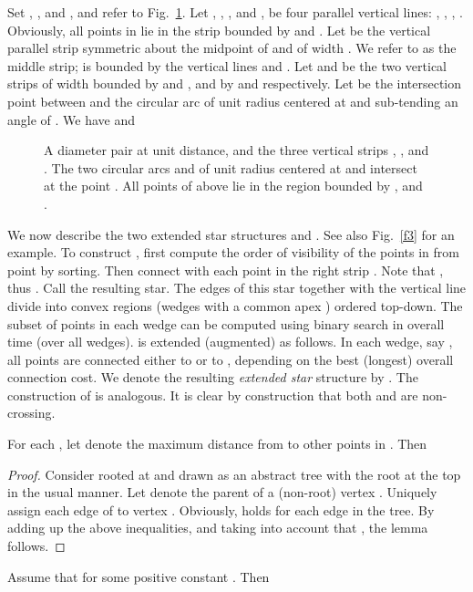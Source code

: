 \documentclass[proceedings]{stacs}
\begin{document}
\smallskip
Set , ,  and , and refer to
Fig.~\ref{f1}.  Let , , , and ,
be four parallel vertical lines:
,  , , .
Obviously, all points in  lie in the strip bounded by  and
.
Let  be the vertical parallel strip symmetric about the midpoint
of  and of width . We refer to  as the middle strip;
 is bounded by the vertical lines  and .
Let  and  be the two vertical strips of width 
bounded by  and , and by  and 
respectively. Let  be the intersection point between
 and the circular arc  of unit radius centered at
 and sub-tending an angle of . We have  and


\begin{figure} [htb]
\centerline{\epsfxsize=2.7in }
\caption{\small A diameter pair  at unit distance, and the three
vertical strips , , and . The two circular arcs
  and  of unit radius centered at  and 
intersect at the point . All points of  above
 lie in the region bounded by ,   and .}
\label{f1}
\end{figure}
We now describe the two extended star structures  and .
See also Fig.~\ref{f3} for an example.
To construct , first compute the order of visibility of the
points in  from point  by sorting. Then connect  with each
point in the right strip . Note that , thus . Call  the resulting star. The edges of this star together
with the vertical line  divide 
into convex regions (wedges with a common apex ) ordered top-down.
The subset of points in each wedge can be computed using binary search
in overall  time (over all wedges).
 is extended (augmented) as follows.
In each wedge, say , all points are connected either to
 or to , depending on the best (longest) overall connection
cost. We denote the resulting {\em extended star} structure by .
The construction of  is analogous. It is clear by construction
that both  and  are non-crossing.

\begin{lemma} \label{L4}
For each , let  denote the maximum distance
from  to other points in . Then

\end{lemma}
\begin{proof}
Consider  rooted at  and drawn as an abstract tree
with the root at the top in the usual manner. Let  denote the
parent of a (non-root) vertex . Uniquely assign each
edge  of  to vertex . Obviously,
 holds for each edge in the tree.
By adding up the above inequalities, and taking into account that
, the lemma follows.
\end{proof}


\begin{lemma} \label{L5}
Assume that  for some positive constant
. Then

\end{lemma}
\end{document}
